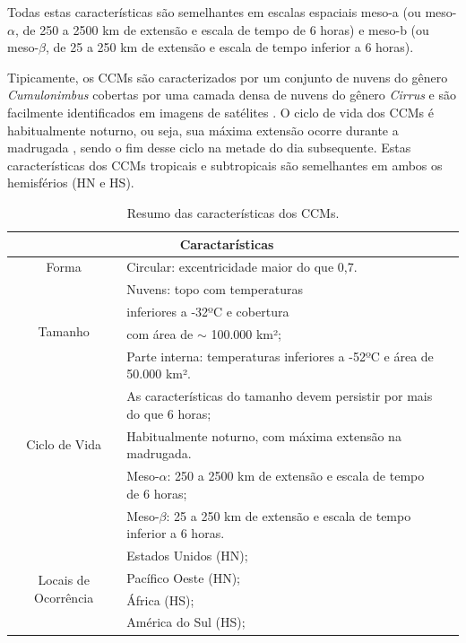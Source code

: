 Todas estas características são semelhantes em escalas espaciais meso-a (ou meso-$\alpha$, de 250 a 2500 km de extensão e escala de tempo de 6 horas) e meso-b (ou meso-$\beta$, de 25 a 250 km de extensão e escala de tempo inferior a 6 horas).

Tipicamente, os CCMs são caracterizados por um conjunto de nuvens do gênero \textit{Cumulonimbus} cobertas por uma camada densa de nuvens do gênero \textit{Cirrus} e são facilmente identificados em imagens de satélites \cite{silvadias87}. O ciclo de vida dos CCMs é habitualmente noturno, ou seja, sua máxima extensão ocorre durante a madrugada \cite{velascofritsch87}, sendo o fim desse ciclo na metade do dia subsequente. Estas características dos CCMs tropicais e subtropicais são semelhantes em ambos os hemisférios (HN e HS).

\begin{table}[!hbp]
\caption{Resumo das características dos CCMs.}
\label{tab03}
\centering
\begin{tabular}{c|p{12cm}l}
\hline
\multicolumn{2}{c}{Caractarísticas}                                                 \\
\hline
Forma                                       & Circular: excentricidade maior do que 0,7.\\
\hline
\multirow{4}{2cm}{Tamanho}                  & Nuvens: topo com temperaturas \\
                                            & inferiores a -32ºC e cobertura \\
                                            & com área de $\sim$ 100.000 km²; \\
                                            & Parte interna: temperaturas inferiores a -52ºC e área de 50.000 km².         \\
\hline
\multirow{3}{2cm}{Ciclo de Vida}            & As características do tamanho devem persistir por mais do que 6 horas;   \\
                                            & Habitualmente noturno, com máxima extensão na madrugada.                \\
\hline
\multirow{3}{2cm}{Escala}                   & Meso-$\alpha$: 250 a 2500 km de extensão e escala de tempo de 6 horas;      \\
                                            & Meso-$\beta$: 25 a 250 km de extensão e escala de tempo inferior a 6 horas. \\
\hline
\multirow{4}{2cm}{Locais de Ocorrência} & Estados Unidos (HN);                  \\
                                            & Pacífico Oeste (HN);              \\
                                            & África (HS);                      \\
                                            & América do Sul (HS);              \\
\hline
\end{tabular}
\end{table}

